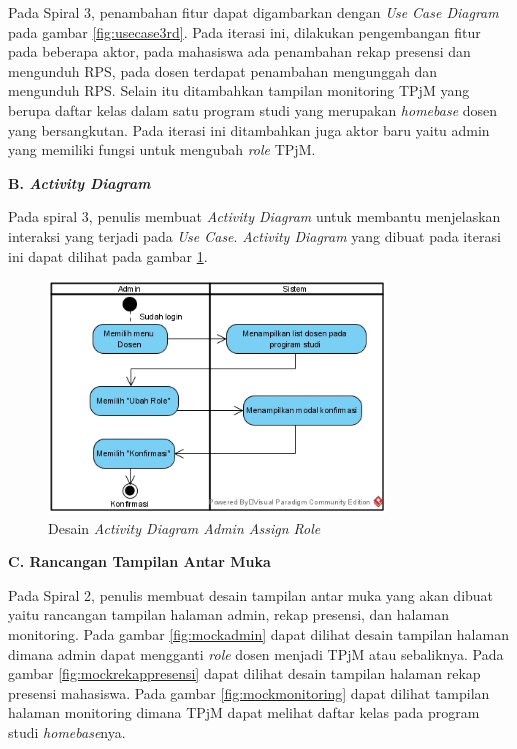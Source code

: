 	Pada Spiral 3, penambahan fitur dapat digambarkan dengan \textit{Use Case Diagram} pada gambar \ref{fig:usecase3rd}. Pada iterasi ini, dilakukan pengembangan fitur pada beberapa aktor, pada mahasiswa ada penambahan rekap presensi dan mengunduh RPS, pada dosen terdapat penambahan mengunggah dan mengunduh RPS. Selain itu ditambahkan tampilan monitoring TPjM yang berupa daftar kelas dalam satu program studi yang merupakan \textit{homebase} dosen yang bersangkutan. Pada iterasi ini ditambahkan juga aktor baru yaitu admin yang memiliki fungsi untuk mengubah \textit{role} TPjM.


\textbf{B. \textit{Activity Diagram}}

	Pada spiral 3, penulis membuat \textit{Activity Diagram} untuk membantu menjelaskan interaksi yang terjadi pada \textit{Use Case}. \textit{Activity Diagram} yang dibuat pada iterasi ini dapat dilihat pada gambar \ref{fig:actadmin}.

\begin{figure}[h!]
	\centering
	\includegraphics[width=0.8\textwidth]{gambar/diagram/Admin Assign Role}
	\caption{Desain \textit{Activity Diagram Admin Assign Role}}
	\label{fig:actadmin}
\end{figure}

\textbf{C. Rancangan Tampilan Antar Muka}

	Pada Spiral 2, penulis membuat desain tampilan antar muka yang akan dibuat yaitu rancangan tampilan halaman admin, rekap presensi, dan halaman monitoring. Pada gambar \ref{fig:mockadmin} dapat dilihat desain tampilan halaman dimana admin dapat mengganti \textit{role} dosen menjadi TPjM atau sebaliknya. Pada gambar \ref{fig:mockrekappresensi} dapat dilihat desain tampilan halaman rekap presensi mahasiswa. Pada gambar \ref{fig:mockmonitoring} dapat dilihat tampilan halaman monitoring dimana TPjM dapat melihat daftar kelas pada program studi \textit{homebase}nya.

